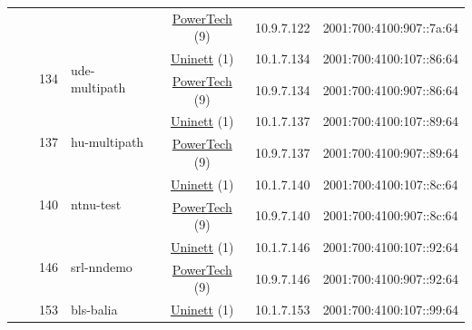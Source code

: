 \begin{small}
\begin{center}
\begin{longtable}{|c|c|c|c|c|c|c|c|}
  &  &  &  & \multicolumn{2}{|c|}{\tiny{\href{http://www.powertech.no}{PowerTech} (9)}} & \tiny{10.9.7.122} & \tiny{2001:700:4100:907::7a:64} \\* \cline{3-3}\cline{4-4}\cline{5-5}\cline{6-6}\cline{7-7}\cline{8-8}
  &  & \multirow{2}{*}{\tiny{134}} & \multicolumn{1}{|l|}{\multirow{2}{*}{\tiny{ude-multipath}}} & \multicolumn{2}{|c|}{\tiny{\href{https://www.uninett.no}{Uninett} (1)}} & \tiny{10.1.7.134} & \tiny{2001:700:4100:107::86:64} \\* \cline{5-5}\cline{6-6}\cline{7-7}\cline{8-8}
  &  &  &  & \multicolumn{2}{|c|}{\tiny{\href{http://www.powertech.no}{PowerTech} (9)}} & \tiny{10.9.7.134} & \tiny{2001:700:4100:907::86:64} \\* \cline{3-3}\cline{4-4}\cline{5-5}\cline{6-6}\cline{7-7}\cline{8-8}
  &  & \multirow{2}{*}{\tiny{137}} & \multicolumn{1}{|l|}{\multirow{2}{*}{\tiny{hu-multipath}}} & \multicolumn{2}{|c|}{\tiny{\href{https://www.uninett.no}{Uninett} (1)}} & \tiny{10.1.7.137} & \tiny{2001:700:4100:107::89:64} \\* \cline{5-5}\cline{6-6}\cline{7-7}\cline{8-8}
  &  &  &  & \multicolumn{2}{|c|}{\tiny{\href{http://www.powertech.no}{PowerTech} (9)}} & \tiny{10.9.7.137} & \tiny{2001:700:4100:907::89:64} \\* \cline{3-3}\cline{4-4}\cline{5-5}\cline{6-6}\cline{7-7}\cline{8-8}
  &  & \multirow{2}{*}{\tiny{140}} & \multicolumn{1}{|l|}{\multirow{2}{*}{\tiny{ntnu-test}}} & \multicolumn{2}{|c|}{\tiny{\href{https://www.uninett.no}{Uninett} (1)}} & \tiny{10.1.7.140} & \tiny{2001:700:4100:107::8c:64} \\* \cline{5-5}\cline{6-6}\cline{7-7}\cline{8-8}
  &  &  &  & \multicolumn{2}{|c|}{\tiny{\href{http://www.powertech.no}{PowerTech} (9)}} & \tiny{10.9.7.140} & \tiny{2001:700:4100:907::8c:64} \\* \cline{3-3}\cline{4-4}\cline{5-5}\cline{6-6}\cline{7-7}\cline{8-8}
  &  & \multirow{2}{*}{\tiny{146}} & \multicolumn{1}{|l|}{\multirow{2}{*}{\tiny{srl-nndemo}}} & \multicolumn{2}{|c|}{\tiny{\href{https://www.uninett.no}{Uninett} (1)}} & \tiny{10.1.7.146} & \tiny{2001:700:4100:107::92:64} \\* \cline{5-5}\cline{6-6}\cline{7-7}\cline{8-8}
  &  &  &  & \multicolumn{2}{|c|}{\tiny{\href{http://www.powertech.no}{PowerTech} (9)}} & \tiny{10.9.7.146} & \tiny{2001:700:4100:907::92:64} \\* \cline{3-3}\cline{4-4}\cline{5-5}\cline{6-6}\cline{7-7}\cline{8-8}
  &  & \multirow{2}{*}{\tiny{153}} & \multicolumn{1}{|l|}{\multirow{2}{*}{\tiny{bls-balia}}} & \multicolumn{2}{|c|}{\tiny{\href{https://www.uninett.no}{Uninett} (1)}} & \tiny{10.1.7.153} & \tiny{2001:700:4100:107::99:64} \\* \cline{5-5}\cline{6-6}\cline{7-7}\cline{8-8}

\end{longtable}
\end{center}
\end{small}
